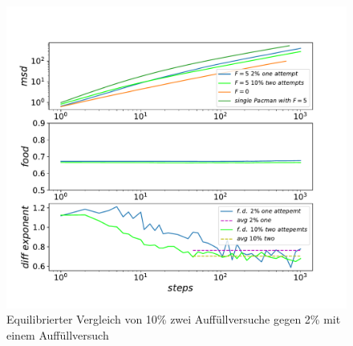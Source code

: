 \documentclass[a4paper, 12pt]{report}
\begin{document}
\begin{figure}[H]
	\centering
	\includegraphics[scale=0.7]{10_2_vs_2_1_new.pdf}
	\caption{Equilibrierter Vergleich von 10\% zwei Auffüllversuche gegen 2\% mit einem Auffüllversuch}
\end{figure}

\clearpage
\end{document}
